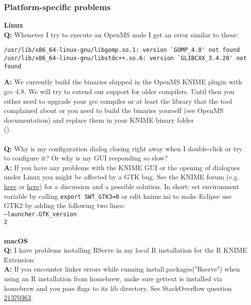 \subsubsection{Platform-specific problems}
\textbf{Linux}\\
\textbf{Q:} Whenever I try to execute an OpenMS node I get an error similar to these:
\begin{verbatim}
/usr/lib/x86_64-linux-gnu/libgomp.so.1: version `GOMP_4.0' not found
/usr/lib/x86_64-linux-gnu/libstdc++.so.6: version `GLIBCXX_3.4.20' not found
\end{verbatim}
\textbf{A:} We currently build the binaries shipped in the OpenMS KNIME plugin with gcc 4.8. We will try to extend our support for older compilers.
Until then you either need to upgrade your gcc compiler
or at least the library that the tool complained about or you need to build the
binaries yourself (see OpenMS documentation) and replace them in your KNIME binary folder\\
().
\\\\
\textbf{Q:} Why is my configuration dialog closing right away when I double-click or try to configure it? Or why is my GUI responding so slow?\\
\textbf{A:} If you have any problems with the KNIME GUI or the opening of dialogues under Linux you might be affected by a
GTK bug. See the KNIME forum (e.g. \href{https://tech.knime.org/forum/knime-general/ubuntu-1604-slow-performance}{here} or \href{https://tech.knime.org/forum/knime-users/knime-300-crashes-after-splash-screen}{here}) for a discussion and a possible solution. In short: set environment variable by calling \texttt{export SWT\_GTK3=0} or edit knime.ini to make Eclipse use GTK2 by adding the following two lines:\\
\texttt{--launcher.GTK\_version\\
2}\\\\
\textbf{macOS}\\
\textbf{Q:} I have problems installing RServe in my local R installation for the R KNIME Extension:\\
\textbf{A:} If you encounter linker errors while running install.packages("Rserve") when using an R installation from homebrew, make sure gettext is installed via homebrew and you pass flags to its lib directory. See StackOverflow question \href{http://stackoverflow.com/questions/21370363/link-error-installing-rcpp-library-not-found-for-lintl}{21370363}.
